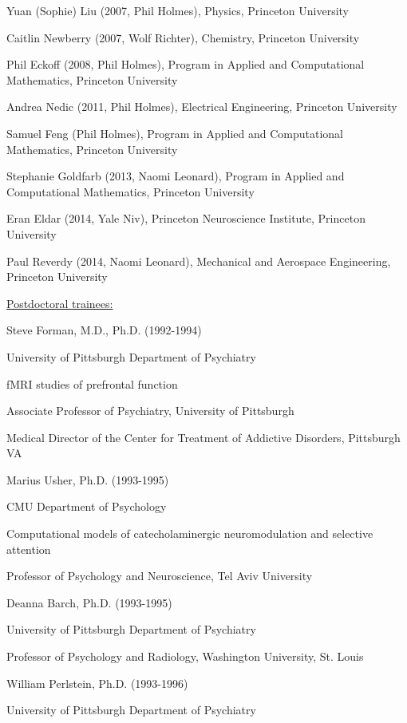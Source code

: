\documentclass[10 pt]{article}
\begin{document}
Yuan (Sophie) Liu (2007, Phil Holmes), Physics, Princeton University
    \smallskip

Caitlin Newberry (2007, Wolf Richter), Chemistry, Princeton University
    \smallskip

Phil Eckoff (2008, Phil Holmes), Program in Applied and Computational Mathematics, Princeton University

Andrea Nedic (2011, Phil Holmes), Electrical Engineering, Princeton University
    \smallskip

Samuel Feng (Phil Holmes), Program in Applied and Computational Mathematics, Princeton University
    \smallskip

Stephanie Goldfarb (2013, Naomi Leonard), Program in Applied and Computational Mathematics, Princeton University
    \smallskip

Eran Eldar (2014, Yale Niv), Princeton Neuroscience Institute, Princeton University
    \smallskip

Paul Reverdy (2014, Naomi Leonard), Mechanical and Aerospace Engineering, Princeton University
    \bigskip


{\fontsize{13pt}{16 pt}\selectfont \underline{Postdoctoral trainees:}}
    \smallskip

Steve Forman, M.D., Ph.D. (1992-1994)

University of Pittsburgh Department of Psychiatry

fMRI studies of prefrontal function

Associate Professor of Psychiatry, University of Pittsburgh

Medical Director of the Center for Treatment of Addictive Disorders, Pittsburgh VA
    \medskip

Marius Usher, Ph.D. (1993-1995)

CMU Department of Psychology

Computational models of catecholaminergic neuromodulation and selective attention

Professor of Psychology and Neuroscience, Tel Aviv University
    \medskip

Deanna Barch, Ph.D. (1993-1995)

University of Pittsburgh Department of Psychiatry

Professor of Psychology and Radiology, Washington University, St. Louis
    \medskip

William Perlstein, Ph.D. (1993-1996)

University of Pittsburgh Department of Psychiatry
\end{document}
